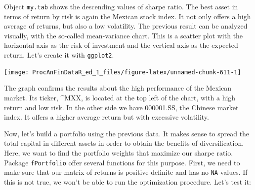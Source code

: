 \documentclass[11pt,]{book}
\newenvironment{Shaded}{\begin{snugshade}}{\end{snugshade}}
\newcommand{\KeywordTok}[1]{\textcolor[rgb]{0.27,0.27,0.27}{\textbf{#1}}}
\newcommand{\DataTypeTok}[1]{\textcolor[rgb]{0.27,0.27,0.27}{#1}}
\newcommand{\DecValTok}[1]{\textcolor[rgb]{0.06,0.06,0.06}{#1}}
\newcommand{\FloatTok}[1]{\textcolor[rgb]{0.06,0.06,0.06}{#1}}
\newcommand{\StringTok}[1]{\textcolor[rgb]{0.5,0.5,0.5}{#1}}
\newcommand{\OperatorTok}[1]{\textcolor[rgb]{0.81,0.36,0.00}{\textbf{#1}}}
\newcommand{\NormalTok}[1]{#1}
\begin{document}
Object \texttt{my.tab} shows the descending values of sharpe ratio. The
best asset in terms of return by risk is again the Mexican stock index.
It not only offers a high average of returns, but also a low volatility.
The previous result can be analyzed visually, with the so-called
mean-variance chart. This is a scatter plot with the horizontal axis as
the risk of investment and the vertical axis as the expected return.
Let's create it with \texttt{ggplot2}.

\begin{Shaded}
\end{Shaded}

\begin{center}\texttt{[image: ProcAnFinDataR\_ed\_1\_files/figure-latex/unnamed-chunk-611-1]} \end{center}

The graph confirms the results about the high performance of the Mexican
market. Its ticker, \^{}MXX, is located at the top left of the chart,
with a high return and low risk. In the other side we have 000001.SS,
the Chinese market index. It offers a higher average return but with
excessive volatility.

Now, let's build a portfolio using the previous data. It makes sense to
spread the total capital in different assets in order to obtain the
benefits of diversification. Here, we want to find the portfolio weights
that maximize our sharpe ratio. Package \texttt{fPortfolio} offer
several functions for this purpose. First, we need to make sure that our
matrix of returns is positive-definite and has no \texttt{NA} values. If
this is not true, we won't be able to run the optimization procedure.
Let's test it:
\end{document}
